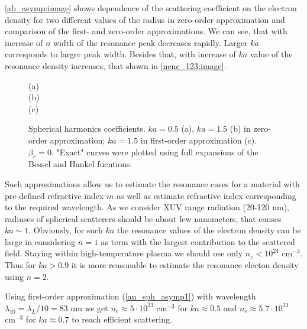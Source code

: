 \autoref{ab_asymp:image} shows dependence of the scattering coefficient on the electron density for two different values of the radius in zero-order approximation and comparison of the first- and zero-order approximations. We can see, that with increase of $n$ width of the resonance peak decreases rapidly. Larger $ka$ corresponds to larger peak width. Besides that, with increase of $ka$ value of the resonance density increases, that shown in \autoref{nenc_123:image}.

    \begin{figure}[ht]
		(a)\qquad {}
		\\ (b)\qquad {}
        \\ (c)\qquad {}
		\caption{Spherical harmonics coefficients. $ka = 0.5$ (a), $ka = 1.5$ (b) in zero-order approximation; $ka = 1.5$ in first-order approximation (c). $\beta_e = 0$. "Exact" curves were plotted using full expansions of the Bessel and Hankel fucntions.}
		\label{ab_asymp:image}
	\end{figure}

Such approximations allow us to estimate the resonance cases for a material with pre-defined refractive index $m$ as well as estimate refractive index corresponding to the required wavelength. As we consider XUV range radiation (20-120 nm), radiuses of spherical scatterers should be about few nanometers, that causes $ka \sim 1$. Obviously, for such $ ka $ the resonance values of the electron density can be large in considering $n = 1$ as term with the largest contribution to the scattered field. Staying within high-temperature plasma we should use only $n_e < 10^{24}$ $\textrm{cm}^{-3}$. Thus for $ka > 0.9$ it is more reasonable to estimate the resonance electon density using $n = 2$.

Using first-order approximation (\ref{an_sph_asymp1}) with wavelength $\lambda_{10} = \lambda_{L} / 10 = 83$ nm we get $n_e \approx 5 \cdot 10^{23}$ $\textrm{cm}^{-3}$ for $ka \approx 0.5$ and $n_e \approx 5.7 \cdot 10^{23}$ $\textrm{cm}^{-3}$ for $ka \approx 0.7$ to reach efficient scattering.




